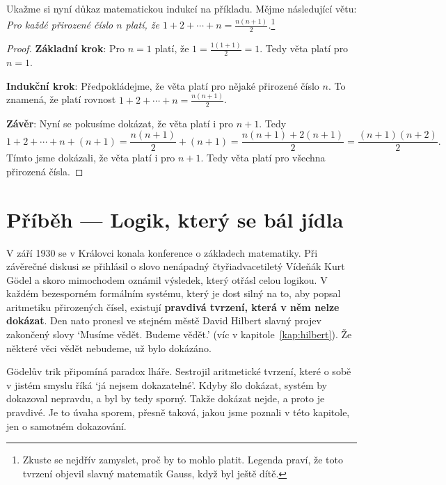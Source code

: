 \begin{example}
  Ukažme si nyní důkaz matematickou indukcí na příkladu. Mějme následující větu: \textit{Pro každé přirozené číslo $n$ platí, že $1 + 2 + \cdots + n = \frac{n(n+1)}{2}$.}\footnote{Zkuste se nejdřív zamyslet, proč by to mohlo platit. Legenda praví, že toto tvrzení objevil slavný matematik Gauss, když byl ještě dítě.}  

  \begin{proof}

    \textbf{Základní krok}: Pro $n = 1$ platí, že $1 = \frac{1(1+1)}{2} = 1$. Tedy věta platí pro $n = 1$.

    \textbf{Indukční krok}: Předpokládejme, že věta platí pro nějaké přirozené číslo $n$. To znamená, že platí rovnost $1 + 2 + \cdots + n = \frac{n(n+1)}{2}$.

    \textbf{Závěr}: Nyní se pokusíme dokázat, že věta platí i pro $n+1$. Tedy
    \begin{equation}
      1 + 2 + \cdots + n + (n+1) = \frac{n(n+1)}{2} + (n+1) = \frac{n(n+1) + 2(n+1)}{2} = \frac{(n+1)(n+2)}{2}.
    \end{equation}
    Tímto jsme dokázali, že věta platí i pro $n+1$. Tedy věta platí pro všechna přirozená čísla.
  \end{proof}
\end{example}
\section{Příběh --- Logik, který se bál jídla}

V září 1930 se v Královci konala konference o základech matematiky. Při závěrečné diskusi se přihlásil o slovo nenápadný čtyřiadvacetiletý Vídeňák Kurt Gödel a skoro mimochodem oznámil výsledek, který otřásl celou logikou. V každém bezesporném formálním systému, který je dost silný na to, aby popsal aritmetiku přirozených čísel, existují \textbf{pravdivá tvrzení, která v něm nelze dokázat}. Den nato pronesl ve stejném městě David Hilbert slavný projev zakončený slovy `Musíme vědět. Budeme vědět.' (víc v kapitole~\ref{kap:hilbert}). Že některé věci vědět nebudeme, už bylo dokázáno.

Gödelův trik připomíná paradox lháře. Sestrojil aritmetické tvrzení, které o sobě v jistém smyslu říká `já nejsem dokazatelné'. Kdyby šlo dokázat, systém by dokazoval nepravdu, a byl by tedy sporný. Takže dokázat nejde, a proto je pravdivé. Je to úvaha sporem, přesně taková, jakou jsme poznali v této kapitole, jen o samotném dokazování.

